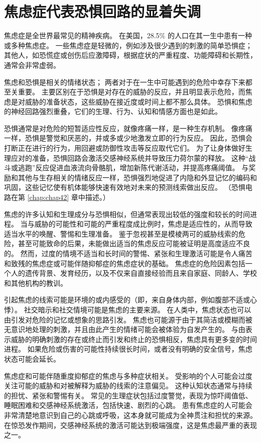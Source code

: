 \section{焦虑症代表恐惧回路的显着失调}

焦虑症是全世界最常见的精神疾病。
在美国，28.5\% 的人口在其一生中患有一种或多种焦虑症。
一些焦虑症是轻微的，例如涉及很少遇到的刺激的简单恐惧症；
其他人，如恐慌症或创伤后应激障碍，根据症状的严重程度、功能障碍和长期性，通常会非常虚弱。


焦虑和恐惧是相关的情绪状态；
两者对于在一生中可能遇到的危险中幸存下来都至关重要。
主要区别在于恐惧是对存在的威胁的反应，并且明显表示危险，而焦虑是对威胁的准备状态，这些威胁在接近度或时间上都不那么具体。
恐惧和焦虑的神经回路强烈重叠，它们的生理、行为、认知和情感方面也是如此。


恐惧通常是对危险的短暂适应性反应，就像疼痛一样，是一种生存机制。
像疼痛一样，恐惧是警觉和厌恶的，并或多或少地激发立即的行为反应。
因此，恐惧会打断正在进行的行为，用回避或防御性攻击等反应取代它们。
为了让身体做好生理应对的准备，恐惧回路会激活交感神经系统并导致压力荷尔蒙的释放。
这种“战斗或逃跑”反应促进血液流向骨骼肌，增加新陈代谢活动，并提高疼痛阈值。
与奖励和其他与生存相关的情绪反应一样，恐惧强烈地促进了内隐和外显记忆的编码和巩固，这些记忆使有机体能够快速有效地对未来的预测线索做出反应。 
（恐惧电路在第 \ref{chap:chap42} 章中描述。）


焦虑的许多认知和生理成分与恐惧相似，但通常表现出较低的强度和较长的时间进程。
当与威胁的可能性和可能的严重程度成比例时，焦虑是适应性的，从而导致适当水平的唤醒、警惕和生理准备。
鉴于忽视甚至是模棱两可的威胁线索的危险，甚至可能致命的后果，未能做出适当的焦虑反应可能被证明是高度适应不良的。
然而，过度的情境不适当和长时间的警惕、紧张和生理激活可能是令人痛苦和致残的焦虑症或可能伴随抑郁症的焦虑症状的基础。
焦虑症的危险因素包括一个人的遗传背景、发育经历，以及不仅来自直接经验而且来自家庭、同龄人、学校和其他机构的教训。


引起焦虑的线索可能是环境的或内感受的（即，来自身体内部，例如腹部不适或心悸）。
社交暗示和社交情境可能是焦虑的主要来源。
在人类中，焦虑状态也可以由引发对危险的记忆或想象的思路引发。
焦虑也可能源于由于其简洁或模糊而被无意识地处理的刺激，并且由此产生的情绪可能会被体验为自发产生的。
与由表示威胁的明确刺激的存在或终止而引发和终止的恐惧相反，焦虑具有更多变的时间进程。
如果危险或伤害的可能性持续很长时间，或者没有明确的安全信号，焦虑状态可能会延长。


焦虑症和可能伴随重度抑郁症的焦虑与多种症状相关。
受影响的个人可能会过度关注可能的威胁和对被解释为威胁的线索的注意偏见。
这种认知状态通常与持续的担忧、紧张和警惕有关。
常见的生理症状包括过度警觉，表现为惊吓阈值低、睡眠困难和交感神经系统激活，包括快速、剧烈的心跳。
患有焦虑症的人可能会非常清楚地意识到自己的心跳或呼吸，这本身就可能成为全神贯注和担忧的来源。
在惊恐发作期间，交感神经系统的激活可能达到极端强度，这是焦虑最严重的表现之一。


